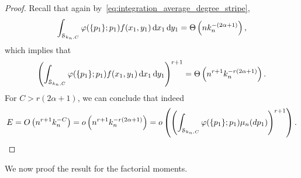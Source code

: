 \begin{proof}
Recall that again by~\eqref{eq:integration_average_degree_stripe},
\begin{align*}
\int_{\mathcal{S}_{k_n,C}} \varphi(\{p_1\};p_1) f(x_1,y_1) \operatorname{\mathrm{d}\hspace{-2pt}} x_1 \operatorname{\mathrm{d}\hspace{-2pt}} y_1 = \Theta\left(n k_n^{-(2\alpha+1)}\right),
\end{align*}
which implies that
\begin{align*}
\left(\int_{\mathcal{S}_{k_n,C}} \varphi(\{p_1\};p_1)f(x_1,y_1) \operatorname{\mathrm{d}\hspace{-2pt}} x_1 \operatorname{\mathrm{d}\hspace{-2pt}} y_1\right)^{r+1} 
= \Theta\left(n^{r+1}k_n^{-r(2\alpha+1)}\right).
\end{align*}
For $C>r(2\alpha+1)$, we can conclude that indeed
\begin{align*}
E = O\left(n^{r+1}k_n^{-C}\right)=o\left(n^{r+1}k_n^{-r(2\alpha+1)}\right)=o\left(\left(\int_{\mathcal{S}_{k_n,C}} \varphi(\{p_1\};p_1)\mu_n(dp_1)\right)^{r+1}\right).
\end{align*}
\end{proof}

We now proof the result for the factorial moments.

